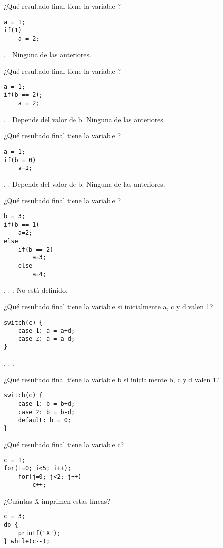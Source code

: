 
\question ¿Qué resultado final tiene la variable ?
\begin{lstlisting}
a = 1; 
if(1)
	a = 2;
\end{lstlisting}
.
.
\choice Ninguna de las anteriores.

\question ¿Qué resultado final tiene la variable ?
\begin{lstlisting}
a = 1;
if(b == 2);
	a = 2;
\end{lstlisting}
.
.
\choice Depende del valor de b.
\choice Ninguna de las anteriores.

\question ¿Qué resultado final tiene la variable ?
\begin{lstlisting}
a = 1;
if(b = 0)
    a=2;
\end{lstlisting}
.
.
\choice Depende del valor de b.
\choice Ninguna de las anteriores.

\question ¿Qué resultado final tiene la variable ?
\begin{lstlisting}
b = 3;
if(b == 1)
	a=2;
else 
	if(b == 2)
	 	a=3; 
	else 
		a=4;
\end{lstlisting}
. 
.
.
\choice No está definido.

\question ¿Qué resultado final tiene la variable  si inicialmente a, c y d valen 1?
\begin{lstlisting}
switch(c) {
	case 1: a = a+d;  
	case 2: a = a-d;
}
\end{lstlisting}
.
.
.

\question ¿Qué resultado final tiene la variable b si inicialmente b, c y d valen 1?
\begin{lstlisting}
switch(c) {
	case 1: b = b+d;
	case 2: b = b-d;
	default: b = 0;
}
\end{lstlisting}

\question ¿Qué resultado final tiene la variable c?
\begin{lstlisting}
c = 1;
for(i=0; i<5; i++);
	for(j=0; j<2; j++)    
		c++;
\end{lstlisting}

\question ¿Cuántas X imprimen estas líneas?
\begin{lstlisting}
c = 3; 
do {
	printf("X");
} while(c--);
\end{lstlisting}


